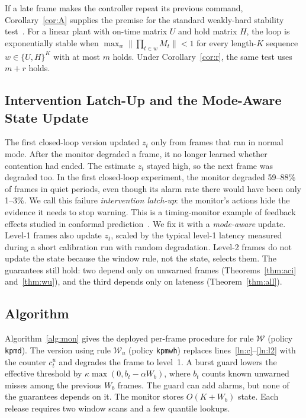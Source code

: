 \documentclass[acmsmall,screen]{acmart}
\newcommand{\pol}[1]{\texttt{#1}}
\newcommand{\Wu}{$\mathcal{W}_u$}
\newcommand{\Wl}{$\mathcal{W}$}
\begin{document}
If a late frame makes the controller repeat its previous command, Corollary~\ref{cor:A} supplies the premise for the standard weakly-hard stability test~\cite{maggio2020,vreman2021}. For a linear plant with on-time matrix $U$ and hold matrix $H$, the loop is exponentially stable when $\max_w\lVert\prod_{t\in w}M_t\rVert<1$ for every length-$K$ sequence $w\in\{U,H\}^K$ with at most $m$ holds. Under Corollary~\ref{cor:r}, the same test uses $m+r$ holds.

\subsection{Intervention Latch-Up and the Mode-Aware State Update}\label{sec:latch}

The first closed-loop version updated $z_t$ only from frames that ran in normal mode. After the monitor degraded a frame, it no longer learned whether contention had ended. The estimate $z_t$ stayed high, so the next frame was degraded too. In the first closed-loop experiment, the monitor degraded 59--88\% of frames in quiet periods, even though its alarm rate there would have been only 1--3\%. We call this failure \emph{intervention latch-up}: the monitor's actions hide the evidence it needs to stop warning. This is a timing-monitor example of feedback effects studied in conformal prediction~\cite{fannjiang2022}. We fix it with a \emph{mode-aware} update. Level-1 frames also update $z_t$, scaled by the typical level-1 latency measured during a short calibration run with random degradation. Level-2 frames do not update the state because the window rule, not the state, selects them. The guarantees still hold: two depend only on unwarned frames (Theorems~\ref{thm:aci} and~\ref{thm:wu}), and the third depends only on lateness (Theorem~\ref{thm:all}).

\subsection{Algorithm}\label{sec:alg}

Algorithm~\ref{alg:mon} gives the deployed per-frame procedure for rule \Wl{} (policy \pol{kpmd}). The version using rule \Wu{} (policy \pol{kpmwh}) replaces lines~\ref{ln:c}--\ref{ln:l2} with the counter $c^u_t$ and degrades the frame to level~1. A burst guard lowers the effective threshold by $\kappa\max(0,b_t-\alpha W_b)$, where $b_t$ counts known unwarned misses among the previous $W_b$ frames. The guard can add alarms, but none of the guarantees depends on it. The monitor stores $O(K+W_b)$ state. Each release requires two window scans and a few quantile lookups.
\end{document}
